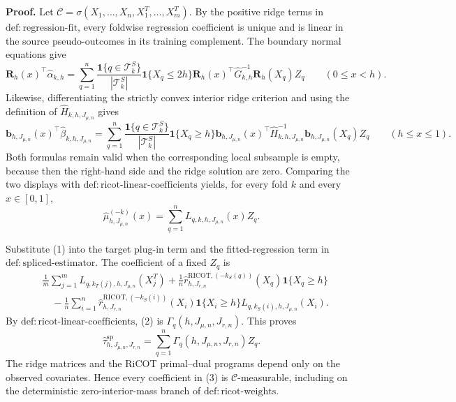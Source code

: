 \textbf{Proof.}
Let \(\mathcal C=\sigma(X_1,\ldots,X_n,X_1^T,\ldots,X_m^T)\).  By the positive ridge terms in \(\mathrm{def:regression\text{-}fit}\), every foldwise regression coefficient is unique and is linear in the source pseudo-outcomes in its training complement.  The boundary normal equations give
\[
\mathbf R_h(x)^\top\widehat\alpha_{k,h}
=\sum_{q=1}^n
\frac{\mathbf 1\{q\in\mathcal T_k^S\}}{|\mathcal T_k^S|}
\mathbf 1\{X_q\le 2h\}
\mathbf R_h(x)^\top\widehat G_{k,h}^{-1}\mathbf R_h(X_q)Z_q
\qquad(0\le x<h).
\]
Likewise, differentiating the strictly convex interior ridge criterion and using the definition of \(\widehat H_{k,h,J_{\mu,n}}\) gives
\[
\mathbf b_{h,J_{\mu,n}}(x)^\top\widehat\beta_{k,h,J_{\mu,n}}
=\sum_{q=1}^n
\frac{\mathbf 1\{q\in\mathcal T_k^S\}}{|\mathcal T_k^S|}
\mathbf 1\{X_q\ge h\}
\mathbf b_{h,J_{\mu,n}}(x)^\top
\widehat H_{k,h,J_{\mu,n}}^{-1}
\mathbf b_{h,J_{\mu,n}}(X_q)Z_q
\qquad(h\le x\le1).
\]
Both formulas remain valid when the corresponding local subsample is empty, because then the right-hand side and the ridge solution are zero.  Comparing the two displays with \(\mathrm{def:ricot\text{-}linear\text{-}coefficients}\) yields, for every fold \(k\) and every \(x\in[0,1]\),
\[
\widehat\mu^{(-k)}_{h,J_{\mu,n}}(x)
=\sum_{q=1}^n L_{q,k,h,J_{\mu,n}}(x)Z_q.
\tag{1}
\]

Substitute (1) into the target plug-in term and the fitted-regression term in \(\mathrm{def:spliced\text{-}estimator}\).  The coefficient of a fixed \(Z_q\) is
\[
\begin{aligned}
{}&\frac1m\sum_{j=1}^mL_{q,k_T(j),h,J_{\mu,n}}(X_j^T)
+\frac1n\widehat r^{\mathrm{RICOT},(-k_S(q))}_{h,J_{r,n}}(X_q)
  \mathbf 1\{X_q\ge h\}\\
&\quad-\frac1n\sum_{i=1}^n
\widehat r^{\mathrm{RICOT},(-k_S(i))}_{h,J_{r,n}}(X_i)
\mathbf 1\{X_i\ge h\}L_{q,k_S(i),h,J_{\mu,n}}(X_i).
\end{aligned}
\tag{2}
\]
By \(\mathrm{def:ricot\text{-}linear\text{-}coefficients}\), (2) is \(\Gamma_q(h,J_{\mu,n},J_{r,n})\).  This proves
\[
\widehat\tau^{\mathrm{sp}}_{h,J_{\mu,n},J_{r,n}}
=\sum_{q=1}^n\Gamma_q(h,J_{\mu,n},J_{r,n})Z_q.
\tag{3}
\]
The ridge matrices and the RiCOT primal--dual programs depend only on the observed covariates.  Hence every coefficient in (3) is \(\mathcal C\)-measurable, including on the deterministic zero-interior-mass branch of \(\mathrm{def:ricot\text{-}weights}\).

